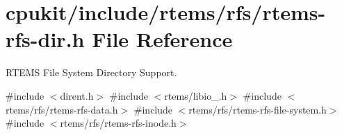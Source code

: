 \hypertarget{rtems-rfs-dir_8h}{}\section{cpukit/include/rtems/rfs/rtems-\/rfs-\/dir.h File Reference}
\label{rtems-rfs-dir_8h}


R\+T\+E\+MS File System Directory Support.  


{\ttfamily \#include $<$dirent.\+h$>$}\newline
{\ttfamily \#include $<$rtems/libio\+\_\+.\+h$>$}\newline
{\ttfamily \#include $<$rtems/rfs/rtems-\/rfs-\/data.\+h$>$}\newline
{\ttfamily \#include $<$rtems/rfs/rtems-\/rfs-\/file-\/system.\+h$>$}\newline
{\ttfamily \#include $<$rtems/rfs/rtems-\/rfs-\/inode.\+h$>$}\newline
